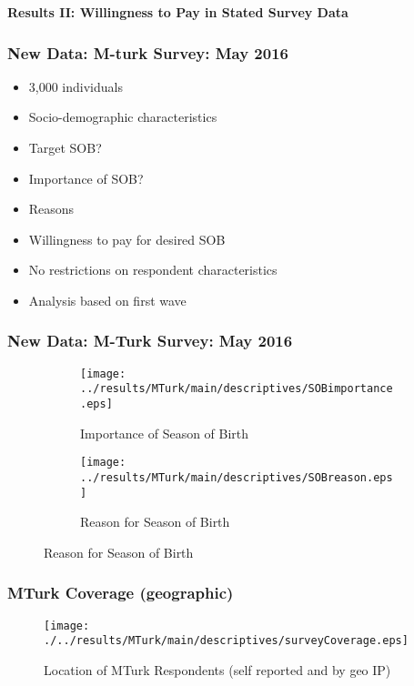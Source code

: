 \documentclass[10pt,letterpaper,subeqn]{beamer}
\begin{document}
\begin{frame}
  \begin{center}
    \textbf{Results II: Willingness to Pay in Stated Survey Data}
  \end{center}
\end{frame}
\begin{frame}
  \frametitle{New Data: M-turk Survey: May 2016}
  \begin{itemize}
  \item 3,000 individuals
  \item Socio-demographic characteristics
  \item Target SOB?
  \item Importance of SOB?
  \item Reasons
  \item Willingness to pay for desired SOB
  \item No restrictions on respondent characteristics
  \item \textcolor[rgb]{1.00,0.00,0.00}{Analysis based on first wave}
  \end{itemize}
\end{frame}


\setcounter{figure}{6}
\begin{frame}[label=MTurk]
  \frametitle{New Data: M-Turk Survey: May 2016}
  \begin{figure}[htpb!]
    \begin{center}
      \caption{Descriptive Results}
      \begin{subfigure}{.5\textwidth}
        \centering
        \texttt{[image: ../results/MTurk/main/descriptives/SOBimportance.eps]}
        \caption{Importance of Season of Birth}
        \label{fig:importanceMTurk}
      \end{subfigure}%
      \begin{subfigure}{.5\textwidth}
        \centering
        \texttt{[image: ../results/MTurk/main/descriptives/SOBreason.eps]}
        \caption{Reason for Season of Birth}
        \label{fig:reasonMTurk}
      \end{subfigure}
    \end{center}
  \end{figure}
\end{frame}

\setcounter{figure}{7}
\begin{frame}[label=MTurkCover]
  \frametitle{MTurk Coverage (geographic)}
  \begin{figure}[htpb!]
    \begin{center}
      \centering
      \caption{Location of MTurk Respondents (self reported and by geo IP)}
      \texttt{[image: ./../results/MTurk/main/descriptives/surveyCoverage.eps]}
    \end{center}
  \end{figure}
  \vspace{-5mm}
\end{frame}
\end{document}
